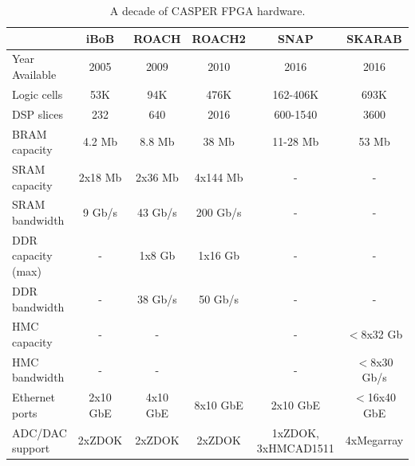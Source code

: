 \documentclass{ws-jai}
\begin{document}
\begin{table}[htb]
\caption{A decade of CASPER FPGA hardware.}
\label{table:fpga-hardware}
\centering
\begin{tabular}{lccccc}
 & iBoB & ROACH & ROACH2 & SNAP & SKARAB \\
\hline
Year Available    & 2005     & 2009     & 2010        & 2016        & 2016               \\
Logic cells       & 53K      & 94K      & 476K        & 162-406K    & 693K               \\
DSP slices        & 232      & 640      & 2016        & 600-1540    & 3600               \\
BRAM capacity     & 4.2 Mb   & 8.8 Mb   & 38 Mb       & 11-28 Mb    & 53 Mb              \\
SRAM capacity     & 2x18 Mb  & 2x36 Mb  & 4x144 Mb    & -           & -                  \\
SRAM bandwidth    & 9 Gb/s   & 43 Gb/s  & 200 Gb/s    & -           & -                  \\
DDR capacity (max)& -        & 1x8 Gb   & 1x16 Gb     & -           & -                  \\
DDR bandwidth     & -        & 38 Gb/s  & 50 Gb/s     & -           & -                  \\
HMC capacity      & -        & -        &             & -           & $<$8x32 Gb         \\
HMC bandwidth     & -        & -        &             & -           & $<$8x30 Gb/s       \\
Ethernet ports    & 2x10 GbE & 4x10 GbE & 8x10 GbE    & 2x10 GbE    & $<$16x40 GbE       \\
ADC/DAC support   & 2xZDOK   & 2xZDOK   & 2xZDOK      & 1xZDOK, 3xHMCAD1511 & 4xMegarray \\
\end{tabular}
\end{table}
\end{document}
